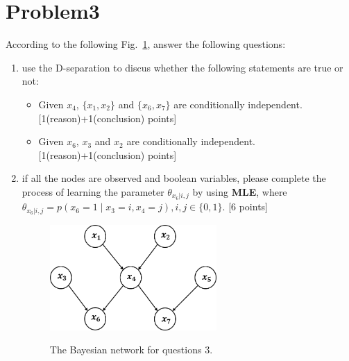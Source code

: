 \documentclass[10pt]{article}
\begin{document}
\section{Problem3}
According to the following Fig.~\ref{fig2}, answer the following questions:
\begin{enumerate}
    \item[(a)]
    use the D-separation to discus whether the following statements are true or not: 
    \begin{itemize}
        \item[(1)] Given $x_4$, $ \{x_1, x_2\} $ and $ \{x_6, x_7\} $ are conditionally independent.{\color{red} [1(reason)+1(conclusion) points]}
        
		\item[(2)] Given $x_6$, $ x_3 $ and $ x_2 $ are conditionally independent.{\color{red} [1(reason)+1(conclusion) points]}
    \end{itemize}

	\item[(b)] if all the nodes are observed and boolean variables, please complete the process of learning the parameter $ \theta_{x_6|i,j} $ by using \textbf{MLE}, where $ \theta_{x_6|i,j} = p(x_6 = 1\mid x_3 = i, x_4 = j), i,j \in \{ 0, 1\}$.{\color{red} [6 points]}

	\begin{figure}[h!] 
		\centering
		\includegraphics[width=2.5in]{3.png}
		\label{fig2}
		\caption{The Bayesian network for questions $3$.}
	\end{figure}


\end{enumerate}
\end{document}
